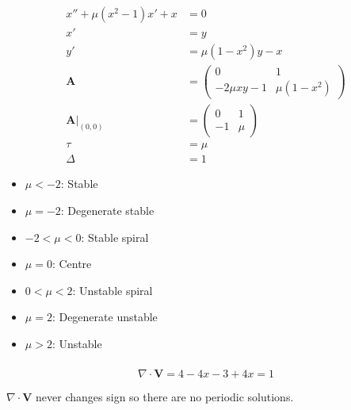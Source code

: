 \documentclass{article}
\begin{document}
\begin{align*}
  x'' + \mu (x^2 - 1) x' + x         & = 0                              \\
  x'                                 & = y                              \\
  y'                                 & = \mu (1 - x^2) y - x            \\
  \mathbf{A}                         & = \begin{pmatrix}
                                           0              & 1             \\
                                           -2 \mu x y - 1 & \mu (1 - x^2)
                                         \end{pmatrix} \\
  \left. \mathbf{A} \right|_{(0, 0)} & = \begin{pmatrix}
                                           0  & 1   \\
                                           -1 & \mu
                                         \end{pmatrix}                 \\
  \tau                               & = \mu                            \\
  \Delta                             & = 1
\end{align*}

\begin{itemize}
  \item $\mu < -2$: Stable

  \item $\mu = -2$: Degenerate stable

  \item $-2 < \mu < 0$: Stable spiral

  \item $\mu = 0$: Centre

  \item $0 < \mu < 2$: Unstable spiral

  \item $\mu = 2$: Degenerate unstable

  \item $\mu > 2$: Unstable
\end{itemize}

\setcounter{subsubsection}{18}
\subsubsection{}

\[\nabla \cdot \mathbf{V} = 4 - 4 x - 3 + 4 x = 1\]

$\nabla \cdot \mathbf{V}$ never changes sign so there are no periodic solutions.
\end{document}
